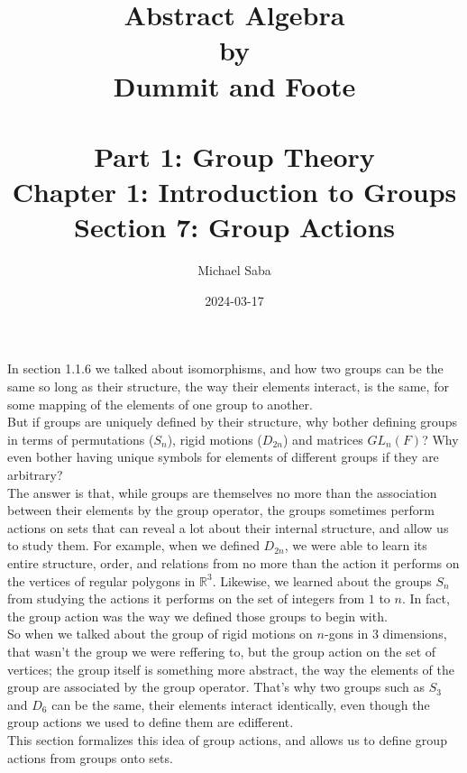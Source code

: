 \documentclass[12pt]{article}
\title{%
    \Huge Abstract Algebra \\
    \large by \\
    \Large Dummit and Foote \\~\\
    \huge Part 1: Group Theory \\
    \LARGE Chapter 1: Introduction to Groups \\
    \Large Section 7: Group Actions
}
\date{2024-03-17}
\author{Michael Saba}
\newcommand{\R}{\mathbb{R}}
\begin{document}
    \maketitle
    \newpage

    In section 1.1.6 we talked about isomorphisms,
    and how two groups can be the same so long as their structure,
    the way their elements interact, is the same,
    for some mapping of the elements of one group to another. \\
    But if groups are uniquely defined by their structure,
    why bother defining groups in terms of permutations ($S_n$),
    rigid motions ($D_{2n}$) and matrices $GL_n(F)$?
    Why even bother having unique symbols for elements of different
    groups if they are arbitrary? \\
    The answer is that, while groups are themselves no more than
    the association between their elements by the group operator,
    the groups sometimes perform actions on sets that can reveal
    a lot about their internal structure,
    and allow us to study them.
    For example, when we defined $D_{2n}$,
    we were able to learn its entire structure, order,
    and relations from no more than the action it performs on the vertices
    of regular polygons in $\R^3$. 
    Likewise, we learned about the groups $S_n$ from studying
    the actions it performs on the set of integers from $1$ to $n$.
    In fact, the group action was the way we defined those groups
    to begin with. \\
    So when we talked about the group of rigid motions on $n$-gons
    in $3$ dimensions,
    that wasn't the group we were reffering to,
    but the group action on the set of vertices;
    the group itself is something more abstract,
    the way the elements of the group are associated
    by the group operator.
    That's why two groups such as $S_3$ and $D_6$ can be the same,
    their elements interact identically,
    even though the group actions we used to define them are edifferent. \\
    This section formalizes this idea of group actions,
    and allows us to define group actions from groups onto sets. \\
\end{document}
